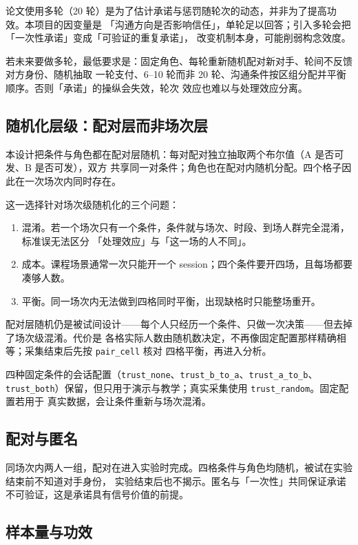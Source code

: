 \documentclass[10pt,a4paper]{ctexart}
\newcommand{\code}[1]{\texttt{#1}}
\begin{document}
论文使用多轮（20 轮）是为了估计承诺与惩罚随轮次的动态，并非为了提高功效。本项目的因变量是
「沟通方向是否影响信任」，单轮足以回答；引入多轮会把「一次性承诺」变成「可验证的重复承诺」，
改变机制本身，可能削弱构念效度。

若未来要做多轮，最低要求是：固定角色、每轮重新随机配对新对手、轮间不反馈对方身份、随机抽取
一轮支付、6--10 轮而非 20 轮、沟通条件按区组分配并平衡顺序。否则「承诺」的操纵会失效，轮次
效应也难以与处理效应分离。

\subsection{随机化层级：配对层而非场次层}

本设计把条件与角色都在配对层随机：每对配对独立抽取两个布尔值（A 是否可发、B 是否可发），双方
共享同一对条件；角色也在配对内随机分配。四个格子因此在一次场次内同时存在。

这一选择针对场次级随机化的三个问题：

\begin{enumerate}
  \item 混淆。若一个场次只有一个条件，条件就与场次、时段、到场人群完全混淆，标准误无法区分
        「处理效应」与「这一场的人不同」。
  \item 成本。课程场景通常一次只能开一个 session；四个条件要开四场，且每场都要凑够人数。
  \item 平衡。同一场次内无法做到四格同时平衡，出现缺格时只能整场重开。
\end{enumerate}

配对层随机仍是被试间设计——每个人只经历一个条件、只做一次决策——但去掉了场次级混淆。代价是
各格实际人数由随机数决定，不再像固定配置那样精确相等；采集结束后先按 \code{pair\_cell} 核对
四格平衡，再进入分析。

四种固定条件的会话配置（\code{trust\_none}、\code{trust\_b\_to\_a}、\code{trust\_a\_to\_b}、
\code{trust\_both}）保留，但只用于演示与教学；真实采集使用 \code{trust\_random}。固定配置若用于
真实数据，会让条件重新与场次混淆。

\subsection{配对与匿名}

同场次内两人一组，配对在进入实验时完成。四格条件与角色均随机，被试在实验结束前不知道对手身份，
实验结束后也不揭示。匿名与「一次性」共同保证承诺不可验证，这是承诺具有信号价值的前提。

\subsection{样本量与功效}
\end{document}

